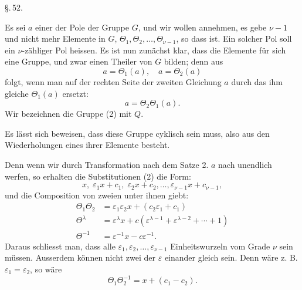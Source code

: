 
\begin{center}
\S.\,52.

\end{center}

Es sei $a$ einer der Pole der Gruppe $G$, und wir wollen
annehmen, es gebe $\nu - 1$ und nicht mehr Elemente in $G$,
$\Theta_1, \Theta_2, \ldots, \Theta_{\nu-1}$, so dass
ist. Ein solcher Pol soll ein $\nu$-zähliger Pol heissen. Es ist
nun zunächst klar, dass die Elemente
für sich eine Gruppe, und zwar einen Theiler von $G$ bilden;
denn aus
\[
a = \Theta_1(a), \quad a = \Theta_2(a)
\]
folgt, wenn man auf der rechten Seite der zweiten Gleichung
$a$ durch das ihm gleiche $\Theta_1(a)$ ersetzt:
\[
a = \Theta_2 \Theta_1(a).
\]
Wir bezeichnen die Gruppe (2) mit $Q$.

Es lässt sich beweisen, dass diese Gruppe cyklisch sein
muss, also aus den Wiederholungen eines ihrer Elemente
besteht.

Denn wenn wir durch Transformation nach dem Satze 2.
$a$ nach unendlich werfen, so erhalten die Substitutionen (2) die
Form:
\[
x, \; \varepsilon_1 x + c_1, \; \varepsilon_2 x + c_2, \ldots, \varepsilon_{\nu-1} x + c_{\nu-1},
\]
und die Composition von zweien unter ihnen giebt:
\[
\begin{aligned}
\Theta_1 \Theta_2 &= \varepsilon_1 \varepsilon_2 x + (c_2 \varepsilon_1 + c_1) \\
\Theta^\lambda &= \varepsilon^\lambda x + c(\varepsilon^{\lambda-1} + \varepsilon^{\lambda-2} + \cdots + 1) \\
\Theta^{-1} &= \varepsilon^{-1} x - c \varepsilon^{-1}.
\end{aligned}
\]
Daraus schliesst man, dass alle $\varepsilon_1, \varepsilon_2, \ldots, \varepsilon_{\nu-1}$ Einheitswurzeln
vom Grade $\nu$ sein müssen. Ausserdem können nicht zwei
der $\varepsilon$ einander gleich sein. Denn wäre z. B. $\varepsilon_1 = \varepsilon_2$, so wäre
\[
\Theta_1 \Theta_2^{-1} = x + (c_1 - c_2).
\]
